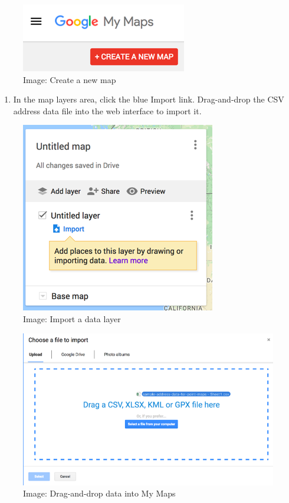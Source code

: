 \documentclass[
  english,
]{book}
\providecommand{\tightlist}{%
  \setlength{\itemsep}{0pt}\setlength{\parskip}{0pt}}
\begin{document}
\begin{figure}
\centering
\includegraphics{images/06-map/mymaps-create-map.png}
\caption{Image: Create a new map}
\end{figure}

\begin{enumerate}
\def\labelenumi{\arabic{enumi})}
\setcounter{enumi}{3}
\tightlist
\item
  In the map layers area, click the blue Import link. Drag-and-drop the CSV address data file into the web interface to import it.
\end{enumerate}

\begin{figure}
\centering
\includegraphics{images/06-map/mymaps-import.png}
\caption{Image: Import a data layer}
\end{figure}

\begin{figure}
\centering
\includegraphics{images/06-map/mymaps-choose-import.png}
\caption{Image: Drag-and-drop data into My Maps}
\end{figure}
\end{document}
